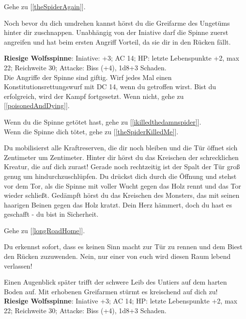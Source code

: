 Gehe zu [\ref{theSpiderAgain}].


Noch bevor du dich umdrehen kannst hörst du die Greifarme des Ungetüms hinter dir zuschnappen.
Unabhängig von der Iniative darf die Spinne zuerst angreifen und hat beim ersten Angriff Vorteil, da sie dir in den Rücken fällt.

\textbf{Riesige Wolfsspinne}: Iniative: +3;
AC 14;
HP: letzte Lebenspunkte +2, max 22;
Reichweite 30;
Attacke: Biss (+4), 1d8+3 Schaden.\\

Die Angriffe der Spinne sind giftig. Wirf jedes Mal einen Konstitutionsrettungswurf mit
DC 14, wenn du getroffen wirst. Bist du erfolgreich, wird der Kampf fortgesetzt.
Wenn nicht, gehe zu [\ref{poisonedAndDying}].

Wenn du die Spinne getötet hast, gehe zu [\ref{ikilledthedamnspider}].
\\Wenn die Spinne dich tötet, gehe zu [\ref{theSpiderKilledMe}].


Du mobilisierst alle Kraftreserven, die dir noch bleiben und die Tür öffnet sich Zentimeter um Zentimeter. Hinter dir hörst du das Kreischen der schrecklichen Kreatur, die auf dich zurast! Gerade noch rechtzeitig ist der Spalt der Tür groß genug um hindurchzuschlüpfen. Du drückst dich durch die Öffnung und stehst vor dem Tor, als die Spinne mit voller Wucht gegen das Holz rennt und das Tor wieder schließt. Gedämpft hörst du das Kreischen des Monsters, das mit seinen haarigen Beinen gegen das Holz kratzt. Dein Herz hämmert, doch du hast es geschafft - du bist in Sicherheit.

Gehe zu [\ref{longRoadHome}].


Du erkennst sofort, dass es keinen Sinn macht zur Tür zu rennen und dem Biest den Rücken zuzuwenden. Nein, nur einer von euch wird diesen Raum lebend verlassen!

Einen Augenblick später trifft der schwere Leib des Untiers auf dem harten Boden auf. Mit erhobenen Greifarmen stürmt es kreischend auf dich zu!\\

\textbf{Riesige Wolfsspinne}: Iniative +3;
AC 14;
HP: letzte Lebenspunkte +2, max 22;
Reichweite 30;
Attacke: Biss (+4), 1d8+3 Schaden.\\

